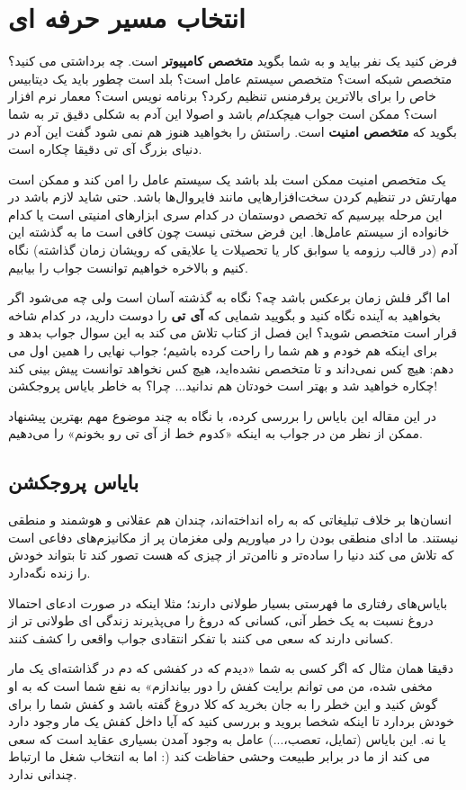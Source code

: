 \section{انتخاب مسیر حرفه ای}
فرض کنید یک نفر بیاید و به شما بگوید
\textbf{متخصص کامپیوتر}
است. چه برداشتی می کنید؟ متخصص شبکه است؟ متخصص سیستم عامل است؟ بلد است چطور باید یک دیتابیس خاص را برای بالاترین پرفرمنس تنظیم رکرد؟ برنامه نویس است؟ معمار نرم افزار است؟ ممکن است جواب
\emph{هیچکدام}
باشد و اصولا این آدم به شکلی دقیق تر به شما بگوید که
\textbf{متخصص امنیت}
است. راستش را بخواهید هنوز هم نمی شود گفت این آدم در دنیای بزرگ آی تی دقیقا چکاره است. 

یک متخصص امنیت ممکن است بلد باشد یک سیستم عامل را امن کند و ممکن است مهارتش در تنظیم کردن سخت‌افزارهایی مانند فایروال‌ها باشد. حتی شاید لازم باشد در این مرحله بپرسیم که تخصص دوستمان در کدام سری ابزارهای امنیتی است یا کدام خانواده از سیستم عامل‌ها. این فرض سختی نیست چون کافی است ما به گذشته این آدم (در قالب رزومه یا سوابق کار یا تحصیلات یا علایقی که رویشان زمان گذاشته) نگاه کنیم و بالاخره خواهیم توانست جواب را بیابیم.

اما اگر فلش زمان برعکس باشد چه؟ نگاه به گذشته آسان است ولی چه می‌شود اگر بخواهید به آینده نگاه کنید و بگویید شمایی که
\textbf{آی تی}
را دوست دارید، در کدام شاخه قرار است متخصص شوید؟ این فصل از کتاب تلاش می کند به این سوال جواب بدهد و برای اینکه هم خودم و هم شما را راحت کرده باشیم؛ جواب نهایی را همین اول می دهم: هیچ کس نمی‌داند و تا متخصص نشده‌اید، هیچ کس نخواهد توانست پیش بینی کند چکاره خواهید شد و بهتر است خودتان هم ندانید... چرا؟ به خاطر بایاس پروجکشن!

در این مقاله این بایاس را بررسی کرده، با نگاه به چند موضوع مهم بهترین پیشنهاد ممکن از نظر من در جواب به اینکه «کدوم خط از آی تی رو بخونم» را می‌دهیم.
\subsection*{بایاس پروجکشن}
انسان‌ها بر خلاف تبلیغاتی که به راه انداخته‌اند، چندان هم عقلانی و هوشمند و منطقی نیستند. ما ادای منطقی بودن را در میاوریم ولی مغزمان پر از مکانیزم‌های دفاعی است که تلاش می کند دنیا را ساده‌تر و ناامن‌تر از چیزی که هست تصور کند تا بتواند خودش را زنده نگه‌دارد.

 بایاس‌های رفتاری ما فهرستی بسیار طولانی دارند؛ مثلا اینکه در صورت ادعای احتمالا دروغ نسبت به یک خطر آنی، کسانی که دروغ را می‌پذیرند زندگی ای طولانی تر از کسانی دارند که سعی می کنند با تفکر انتقادی جواب واقعی را کشف کنند.

دقیقا همان مثال که اگر کسی به شما «دیدم که در کفشی که دم در گذاشته‌ای یک مار مخفی شده، من می توانم برایت کفش را دور بیاندازم» به نفع شما است که به او گوش کنید و این خطر را به جان بخرید که کلا دروغ گفته باشد و کفش شما را برای خودش بردارد تا اینکه شخصا بروید و بررسی کنید که آیا داخل کفش یک مار وجود دارد یا نه. این بایاس (تمایل، تعصب،...) عامل به وجود آمدن بسیاری عقاید است که سعی می کند از ما در برابر طبیعت وحشی حفاظت کند (: اما به انتخاب شغل ما ارتباط چندانی ندارد.

